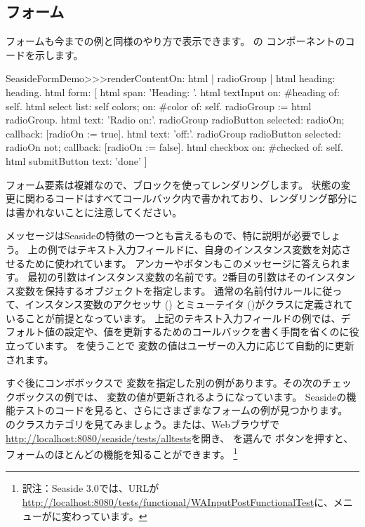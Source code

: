 \documentclass[a4paper,10pt,twoside]{book}
\begin{document}

\subsection{フォーム}

フォームも今までの例と同様のやり方で表示できます。
の コンポーネントのコードを示します。

\begin{code}{}
SeasideFormDemo>>>renderContentOn: html
	| radioGroup |
	html heading: heading.
	html form: [
		html span: 'Heading: '.
		html textInput on: #heading of: self.
		html select
			list: self colors;
			on: #color of: self.
		radioGroup := html radioGroup.
		html text: 'Radio on:'.
		radioGroup radioButton
			selected: radioOn;
			callback: [radioOn := true].
		html text: 'off:'.
		radioGroup radioButton
			selected: radioOn not;
			callback: [radioOn := false].
		html checkbox on: #checked of: self.
		html submitButton
			text: 'done' ]
\end{code}{}

フォーム要素は複雑なので、ブロックを使ってレンダリングします。
状態の変更に関わるコードはすべてコールバック内で書かれており、レンダリング部分には書かれないことに注意してください。

メッセージはSeasideの特徴の一つとも言えるもので、特に説明が必要でしょう。
上の例ではテキスト入力フィールドに、自身のインスタンス変数を対応させるために使われています。
アンカーやボタンもこのメッセージに答えられます。
最初の引数はインスタンス変数の名前です。2番目の引数はそのインスタンス変数を保持するオブジェクトを指定します。
通常の名前付けルールに従って、インスタンス変数のアクセッサ () とミューテイタ ()がクラスに定義されていることが前提となっています。
上記のテキスト入力フィールドの例では、デフォルト値の設定や、値を更新するためのコールバックを書く手間を省くのに役立っています。
を使うことで  変数の値はユーザーの入力に応じて自動的に更新されます。

すぐ後にコンボボックスで 変数を指定した別の例があります。その次のチェックボックスの例では、  変数の値が更新されるようになっています。
Seasideの機能テストのコードを見ると、さらにさまざまなフォームの例が見つかります。
のクラスカテゴリを見てみましょう。または、Webブラウザで\url{http://localhost:8080/seaside/tests/alltests}を開き、
 を選んで  ボタンを押すと、フォームのほとんどの機能を知ることができます。
\footnote{訳注：Seaside 3.0では、URLが\url{http://localhost:8080/tests/functional/WAInputPostFunctionalTest}に、メニューがに変わっています。}
\end{document}
